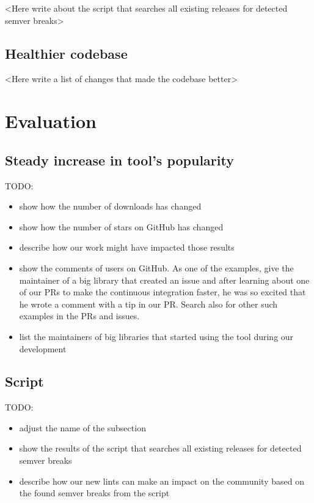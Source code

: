 \documentclass[licencjacka,en]{pracamgr}
\begin{document}
<Here write about the script that searches all existing releases for detected semver breaks>

\section{Healthier codebase}\label{r:section_healthier_codebase}

<Here write a list of changes that made the codebase better>

\chapter{Evaluation}\label{r:chapter_evaluation}

\section{Steady increase in tool's popularity}\label{r:section_popularity_increase}

TODO:
\begin{itemize}
	\item show how the number of downloads has changed
	\item show how the number of stars on GitHub has changed
	\item describe how our work might have impacted those results
	\item show the comments of users on GitHub.
		As one of the examples, give the maintainer of a big
		library that created an issue 
		and after learning about one of our PRs to make the continuous integration faster,
		he was so excited that he wrote a comment with a tip in our PR.
		Search also for other such examples in the PRs and issues.
	\item list the maintainers of big libraries that started using the tool during our development
\end{itemize}

\section{Script}\label{r:section_script_evaluation}

TODO:
\begin{itemize}
        \item adjust the name of the subsection
        \item show the results of the script that searches all existing releases for detected semver breaks
	\item describe how our new lints can make an impact on the community based on the found semver breaks from the script
\end{itemize}
\end{document}
